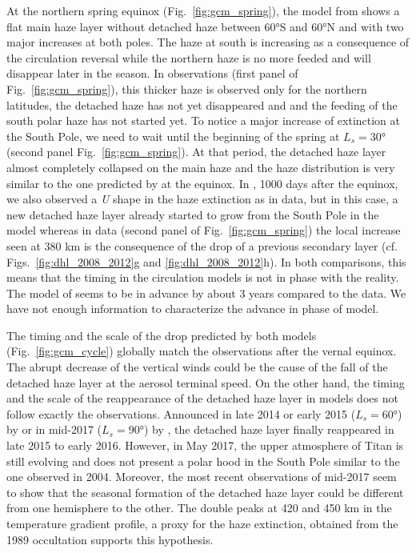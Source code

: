At the northern spring equinox (Fig.~\ref{fig:gcm_spring}), the model from \cite{Lebonnois2012} shows a
flat main haze layer without detached haze between \ang{60}S and \ang{60}N and with two major increases at both poles. The
haze at south is increasing as a consequence of the circulation reversal while the northern haze is no more feeded
and will disappear later in the season. In observations (first panel of Fig.~\ref{fig:gcm_spring}),
this thicker haze is observed only for the northern latitudes, the detached haze has not yet disappeared and
and the feeding of the south polar haze has not started yet. To notice a major increase of extinction at the South Pole,
we need to wait until the beginning of the spring at $L_s = \ang{30}$ (second panel Fig.~\ref{fig:gcm_spring}).
At that period, the detached haze layer almost completely collapsed on the main haze and the haze distribution is very
similar to the one predicted by \cite{Lebonnois2012} at the equinox. In \cite{Larson2015}, 1000 days after the equinox,
we also observed a \emph{U} shape in the haze extinction as in data, but in this case, a new detached haze layer already
started to grow from the South Pole in the model whereas in data (second panel  of Fig.~\ref{fig:gcm_spring}) the local
increase seen at 380 km is the consequence of the drop of a previous secondary layer (cf. Figs.~\ref{fig:dhl_2008_2012}g
and \ref{fig:dhl_2008_2012}h). In both comparisons, this means that the timing in the circulation models is not in
phase with the reality. The model of \cite{Lebonnois2012} seems to be in advance by about 3 years compared to the data.
We have not enough information to characterize the advance in phase of \cite{Larson2015} model.

The timing and the scale of the drop predicted by both models (Fig.~\ref{fig:gcm_cycle}) globally match
the observations after the vernal equinox. The abrupt decrease of the vertical winds could be the cause of the fall of
the detached haze layer at the aerosol terminal speed. On the other hand, the timing and the scale of the reappearance
of the detached haze layer in models does not follow exactly the observations. Announced in late 2014 or early 2015
($L_s = \ang{60}$) by \cite{Larson2015} or in mid-2017 ($L_s = \ang{90}$) by \cite{Lebonnois2012}, the detached haze layer
finally reappeared in late 2015 to early 2016.
However, in May 2017, the upper atmosphere of Titan is still evolving and does not present a polar hood in the South Pole
similar to the one observed in 2004. Moreover, the most recent observations of mid-2017 seem to show that the seasonal
formation of the detached haze layer could be different from one hemisphere to the other. The double peaks at
420 and 450 km in the temperature gradient profile, a proxy for the haze extinction, obtained from the 1989
occultation \citep{Sicardy1999} supports this hypothesis.

